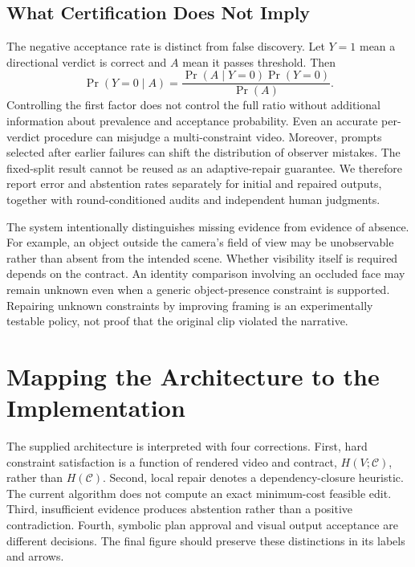 \subsection{What Certification Does Not Imply}

The negative acceptance rate is distinct from false discovery. Let $Y=1$
mean a directional verdict is correct and $A$ mean it passes threshold.
Then
\begin{equation}
 \Pr(Y=0\mid A)
 =\frac{\Pr(A\mid Y=0)\Pr(Y=0)}{\Pr(A)}.
\end{equation}
Controlling the first factor does not control the full ratio without
additional information about prevalence and acceptance probability. Even
an accurate per-verdict procedure can misjudge a multi-constraint video.
Moreover, prompts selected after earlier failures can shift the distribution
of observer mistakes. The fixed-split result cannot be reused as an
adaptive-repair guarantee. We therefore report error and abstention rates
separately for initial and repaired outputs, together with round-conditioned
audits and independent human judgments.

The system intentionally distinguishes missing evidence from evidence of
absence. For example, an object outside the camera's field of view may be
unobservable rather than absent from the intended scene. Whether visibility
itself is required depends on the contract. An identity comparison involving
an occluded face may remain unknown even when a generic object-presence
constraint is supported. Repairing unknown constraints by improving framing
is an experimentally testable policy, not proof that the original clip
violated the narrative.

\section{Mapping the Architecture to the Implementation}
\label{app:implementation-boundary}

The supplied architecture is interpreted with four corrections. First, hard
constraint satisfaction is a function of rendered video and contract,
$H(V;\mathcal C)$, rather than $H(\mathcal C)$. Second, local repair denotes
a dependency-closure heuristic. The current algorithm does not compute an
exact minimum-cost feasible edit. Third, insufficient evidence produces
abstention rather than a positive contradiction. Fourth, symbolic plan
approval and visual output acceptance are different decisions. The final
figure should preserve these distinctions in its labels and arrows.

